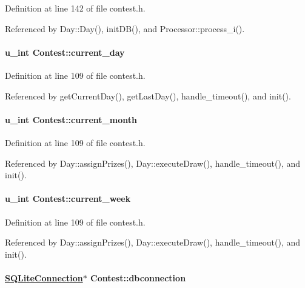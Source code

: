 Definition at line 142 of file contest.h.

Referenced by Day::Day(), init\-DB(), and Processor::process\_\-i().\hypertarget{classContest_Contestm5}{
\paragraph[current\_\-day]{\setlength{\rightskip}{0pt plus 5cm}u\_\-int Contest::current\_\-day}\hfill}
\label{classContest_Contestm5}




Definition at line 109 of file contest.h.

Referenced by get\-Current\-Day(), get\-Last\-Day(), handle\_\-timeout(), and init().\hypertarget{classContest_Contestm7}{
\paragraph[current\_\-month]{\setlength{\rightskip}{0pt plus 5cm}u\_\-int Contest::current\_\-month}\hfill}
\label{classContest_Contestm7}




Definition at line 109 of file contest.h.

Referenced by Day::assign\-Prizes(), Day::execute\-Draw(), handle\_\-timeout(), and init().\hypertarget{classContest_Contestm6}{
\paragraph[current\_\-week]{\setlength{\rightskip}{0pt plus 5cm}u\_\-int Contest::current\_\-week}\hfill}
\label{classContest_Contestm6}




Definition at line 109 of file contest.h.

Referenced by Day::assign\-Prizes(), Day::execute\-Draw(), handle\_\-timeout(), and init().\hypertarget{classContest_Contestm16}{
\paragraph[dbconnection]{\setlength{\rightskip}{0pt plus 5cm}\hyperlink{classSQLiteConnection}{SQLite\-Connection}$\ast$ Contest::dbconnection}\hfill}
\label{classContest_Contestm16}





